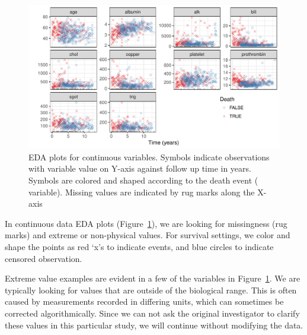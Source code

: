 \documentclass[nojss]{jss}
\begin{document}
\begin{Schunk}
\begin{figure}[!htb]

{\centering \includegraphics[width=\maxwidth]{fig-rfs/rfs-continuousEDA-1} 

}

\caption[EDA plots for continuous variables]{EDA plots for continuous variables. Symbols indicate observations with variable value on Y-axis against follow up time in years. Symbols are colored and shaped according to the death event  ( variable). Missing values are indicated by rug marks along the X-axis}\label{fig:continuousEDA}
\end{figure}
\end{Schunk}

In continuous data EDA plots (Figure~\ref{fig:continuousEDA}), we are looking for missingness (rug marks) and extreme or non-physical values. For survival settings, we color and shape the points as red `x's to indicate events, and blue circles to indicate censored observation.

Extreme value examples are evident in a few of the variables in Figure~\ref{fig:continuousEDA}. We are typically looking for values that are outside of the biological range. This is often caused by measurements recorded in differing units, which can sometimes be corrected algorithmically. Since we can not ask the original investigator to clarify these values in this particular study, we will continue without modifying the data.
\end{document}
